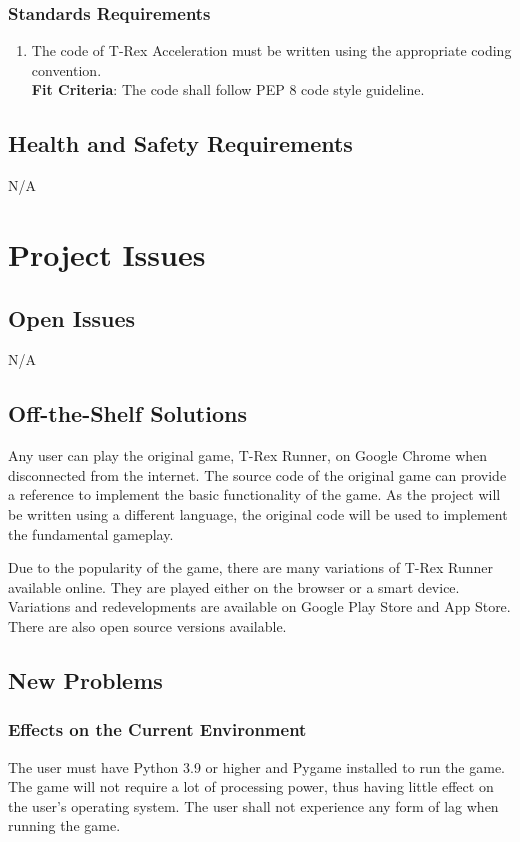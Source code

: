 \documentclass[12pt, titlepage]{article}
\begin{document}
\subsubsection{Standards Requirements}
\begin{enumerate}[leftmargin=1.20cm, label={LR \arabic*}]
    \item The code of T-Rex Acceleration must be written using the appropriate coding convention. \\
    \textbf{Fit Criteria}: The code shall follow PEP 8 code style guideline.
\end{enumerate}

\subsection{Health and Safety Requirements}
N/A

\section{Project Issues}
\subsection{Open Issues}
N/A

\subsection{Off-the-Shelf Solutions}
Any user can play the original game, T-Rex Runner, on Google Chrome when disconnected from the internet. The source code of the original game can provide a reference to implement the basic functionality of the game. As the project will be written using a different language, the original code will be used to implement the fundamental gameplay. 

Due to the popularity of the game, there are many variations of T-Rex Runner available online. They are played either on the browser or a smart device. Variations and redevelopments are available on Google Play Store and App Store. There are also open source versions available. 

\subsection{New Problems}
\subsubsection{Effects on the Current Environment}
The user must have Python 3.9 or higher and Pygame installed to run the game. The game will not require a lot of processing power, thus having little effect on the user's operating system. The user shall not experience any form of lag when running the game.
\end{document}
